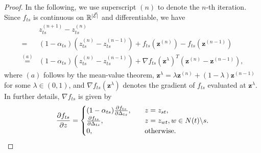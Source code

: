 \begin{proof}
  In the following, we use superscript ${(n)}$ to denote the $n$-th iteration. Since $f_{ts}$ is continuous on $\mathbb{R}^{| \vec{\mathcal{E}} |}$ and differentiable, we have
  \begin{align}\label{eq:ratio_diff_at_n}
    & z_{ts}^{(n+1)} - z_{ts}^{(n)} \nonumber \\
    =& (1-\alpha_{ts}) (z_{ts}^{(n)} - z_{ts}^{(n-1)}) + f_{ts}(\bm{z}^{(n)}) - f_{ts}(\bm{z}^{(n-1)}) \nonumber \\
    \overset{(a)}{=}& (1-\alpha_{ts}) (z_{ts}^{(n)} - z_{ts}^{(n-1)}) + \nabla f_{ts}(\bm{z}^{\lambda})^{T} (\bm{z}^{(n)} - \bm{z}^{(n-1)}),
  \end{align}
  where $(a)$ follows by the mean-value theorem, $\bm{z}^{\lambda} = \lambda \bm{z}^{(n)} + (1 - \lambda) \bm{z}^{(n-1)}$ for some $\lambda \in (0,1)$, and $\nabla f_{ts}(\bm{z}^{\lambda})$ denotes the gradient of $f_{ts}$ evaluated at $\bm{z}^{\lambda}$. In further details, $\nabla f_{ts}$ is given by
  \begin{equation}\label{eq:F_pd}
    \frac{ \partial f_{ts}}{\partial z}=
    \begin{cases}
      ( 1 - \alpha_{ts}) \frac{ \partial f_{ts}}{\partial \Delta_{ts}}, &\quad z = z_{st}, \\
      \frac{ \partial f_{ts}}{\partial \Delta_{ts}}, &\quad z = z_{wt}, w\in N(t)\backslash s. \\
      0, &\quad \mathrm{otherwise}.  \\
    \end{cases}
  \end{equation}
  

\end{proof}
